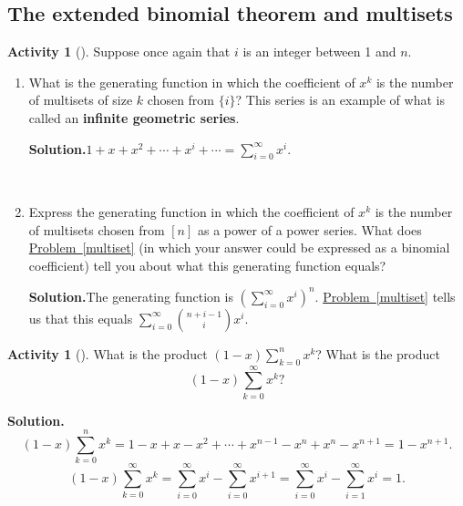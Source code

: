 \documentclass[10pt,]{book}
\newcommand{\terminology}[1]{\textbf{#1}}
\theoremstyle{plain}
\theoremstyle{definition}
\newtheorem{activity}[project]{Activity}
\numberwithin{equation}{chapter}
\begin{document}
\subsection[{The extended binomial theorem and multisets}]{The extended binomial theorem and multisets}\label{subsection-44}
\begin{activity}[]\label{activity-166}
Suppose once again that \(i\) is an integer between 1 and \(n\).%
~\par
\begin{enumerate}[label=(\alph*)]
 \item What is the generating function in which the coefficient of \(x^k\) is the number of multisets of size \(k\) chosen from \(\{i\}\)?  This series is an example of what is called an \terminology{infinite geometric series}.%
\par\medskip\noindent%
\textbf{Solution.}\quad \(1+x+x^2+\cdots+x^i+\cdots=\sum_{i=0}^\infty x^i\).%

~\par
\item Express the generating function in which the coefficient of \(x^k\) is the number of multisets chosen from \([n]\) as a power of a power series.  What does \hyperref[multiset]{Problem~\ref{multiset}} (in which your answer could be expressed as a binomial coefficient) tell you about what this generating function equals?%
\par\medskip\noindent%
\textbf{Solution.}\quad The generating function is \(\left(\sum_{i=0}^\infty x^i\right)^n\).  \hyperref[multiset]{Problem~\ref{multiset}} tells us that this equals \(\sum_{i=0}^\infty\binom{n+i-1}{i}x^i\).%

\end{enumerate}
\end{activity}
\begin{activity}[]\label{activity-167}
What is the product \((1-x)\sum_{k=0}^n x^k\)? What is the product%
\begin{equation*}
(1-x)\sum_{k=0}^\infty x^k?
\end{equation*}
%
\par\medskip\noindent%
\textbf{Solution.}\quad %
\begin{equation*}
(1-x)\sum_{k=0}^n x^k=1-x+x-x^2+\cdots+x^{n-1}-x^n+x^n-x^{n+1} =
1-x^{n+1}.
\end{equation*}
%
\begin{equation*}
(1-x)\sum_{k=0}^\infty x^k=\sum_{i=0}^\infty x^i-\sum_{i=0}^\infty
x^{i+1}=\sum_{i=0}^\infty x^i-\sum_{i=1}^\infty x^i = 1.
\end{equation*}
%
\end{activity}
\end{document}
